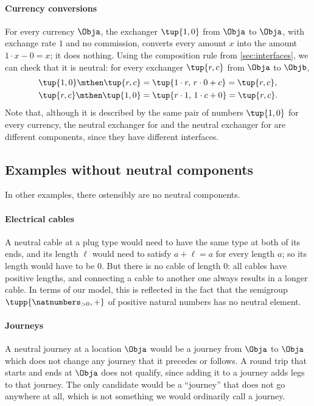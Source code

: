 \paragraph{Currency conversions}
For every currency $\Obja$, the exchanger $\tup{1,0}$ from $\Obja$ to $\Obja$, with exchange rate $1$ and no commission, converts every amount $x$ into the amount $1 \cdot x - 0 = x$; it does nothing. Using the composition rule from \cref{sec:interfaces}, we can check that it is neutral: for every exchanger $\tup{r,c}$ from $\Obja$ to $\Objb$,
\begin{equation}
    \begin{aligned}
        \tup{1,0} \mthen \tup{r,c} & = \tup{1 \cdot r, \, r \cdot 0 + c} = \tup{r,c}, \\
        \tup{r,c} \mthen \tup{1,0} & = \tup{r \cdot 1, \, 1 \cdot c + 0} = \tup{r,c}.
    \end{aligned}
\end{equation}
Note that, although it is described by the same pair of numbers $\tup{1,0}$ for every currency, the neutral exchanger for \CHF and the neutral exchanger for \EUR are different components, since they have different interfaces.

\subsection{Examples without neutral components}

In other examples, there ostensibly are no neutral components.

\paragraph{Electrical cables}
A neutral cable at a plug type would need to have the same type at both of its ends, and its length $\ell$ would need to satisfy $a + \ell = a$ for every length $a$; so its length would have to be $0$. But there is no cable of length $0$: all cables have positive lengths, and connecting a cable to another one always results in a longer cable. In terms of our model, this is reflected in the fact that the semigroup $\tupp{\natnumbers_{>0},+}$ of positive natural numbers has no neutral element.

\paragraph{Journeys}
A neutral journey at a location $\Obja$ would be a journey from $\Obja$ to $\Obja$ which does not change any journey that it precedes or follows. A round trip that starts and ends at $\Obja$ does not qualify, since adding it to a journey adds legs to that journey. The only candidate would be a ``journey'' that does not go anywhere at all, which is not something we would ordinarily call a journey.

